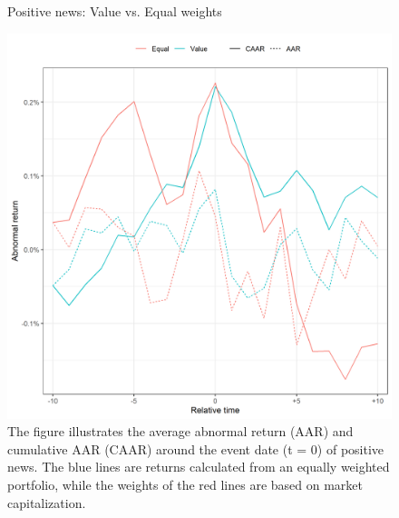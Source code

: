 \begin{figure} [H]
    \centering
    \caption{Positive news: Value vs. Equal weights}
    \includegraphics[scale=0.6]{Projekt/1.Figures analysis/ST_positive_sensitivity_weight.png}
     \caption*{\footnotesize The figure illustrates the average abnormal return (AAR) and cumulative AAR (CAAR) around the event date (t = 0) of positive news. The blue lines are returns calculated from an equally weighted portfolio, while the weights of the red lines are based on market capitalization. }
    \label{fig:ST_pos_sensitivity_weights}
\end{figure} 


